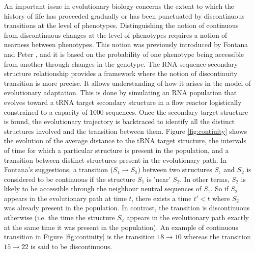 An important issue in evolutionary biology concerns the extent to which the history of life has proceeded gradually or has been punctuated by discontinuous transitions at the level of phenotypes. Distinguishing the notion of continuous from discontinuous changes at the level of phenotypes requires a notion of nearness between phenotypes. This notion was previously introduced by Fontana and Peter \cite{fontana1998continuity}, and it is based on the probability of one phenotype being accessible from another through changes in the genotype. The RNA sequence-secondary structure relationship provides a framework where the notion of discontinuity transition is more precise. It allows understanding of how it arises in the model of evolutionary adaptation. This is done by simulating an RNA population that evolves toward a tRNA target secondary structure in a flow reactor logistically constrained to a capacity of $1000$ sequences. Once the secondary target structure is found, the evolutionary trajectory is backtraced to identify all the distinct structures involved and the transition between them. Figure \ref{fig:contiuity} shows the evolution of the average distance to the tRNA target structure, the intervals of time for which a particular structure is present in the population, and a transition between distinct structures present in the evolutionary path. In Fontana's suggestions, a transition ($S_1 \rightarrow S_2$) between two structures $S_1$ and $S_2$ is considered to be continuous if the structure $S_1$ is 'near' $S_2$. In other terms, $S_2$ is likely to be accessible through the neighbour neutral sequences of $S_1$. So if $S_2$ appears in the evolutionary path at time $t$, there exists a time $t'<t$ where $S_2$ was already present in the population. In contrast, the transition is discontinuous otherwise (i.e. the time the structure $S_2$ appears in the evolutionary path exactly at the same time it was present in the population). An example of continuous transition in Figure \ref{fig:contiuity} is the transition  $18 \rightarrow 10$ whereas the transition $15 \rightarrow 22$ is said to be discontinuous. 

